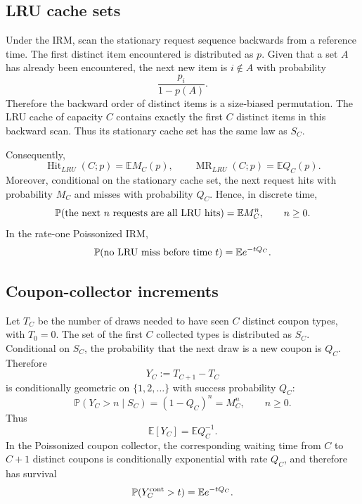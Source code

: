 \documentclass[11pt]{article}
\newcommand{\E}{\mathbb E}
\newcommand{\Pbb}{\mathbb P}
\newcommand{\1}{\mathbf 1}
\newcommand{\MR}{\operatorname{MR}}
\newcommand{\Hit}{\operatorname{Hit}}
\begin{document}
\subsection{LRU cache sets}

Under the IRM, scan the stationary request sequence backwards from a reference time.  The
first distinct item encountered is distributed as $p$.  Given that a set $A$ has already
been encountered, the next new item is $i\notin A$ with probability
\[
        \frac{p_i}{1-p(A)}.
\]
Therefore the backward order of distinct items is a size-biased permutation.  The LRU
cache of capacity $C$ contains exactly the first $C$ distinct items in this backward scan.
Thus its stationary cache set has the same law as $S_C$.

Consequently,
\begin{equation}\label{eq:lru-hit-miss}
        \Hit_{LRU}(C;p)=\E M_C(p),
        \qquad
        \MR_{LRU}(C;p)=\E Q_C(p).
\end{equation}
Moreover, conditional on the stationary cache set, the next request hits with probability
$M_C$ and misses with probability $Q_C$.  Hence, in discrete time,
\begin{equation}\label{eq:no-miss-discrete}
        \Pbb(\hbox{the next } n \hbox{ requests are all LRU hits})
        =\E M_C^n,
        \qquad n\ge0.
\end{equation}
In the rate-one Poissonized IRM,
\begin{equation}\label{eq:no-miss-continuous}
        \Pbb(\hbox{no LRU miss before time }t)=\E e^{-tQ_C}.
\end{equation}

\subsection{Coupon-collector increments}

Let $T_C$ be the number of draws needed to have seen $C$ distinct coupon types, with
$T_0=0$.  The set of the first $C$ collected types is distributed as $S_C$.  Conditional on
$S_C$, the probability that the next draw is a new coupon is $Q_C$.  Therefore
\[
        Y_C:=T_{C+1}-T_C
\]
is conditionally geometric on $\{1,2,\ldots\}$ with success probability $Q_C$:
\begin{equation}\label{eq:geom-survival}
        \Pbb(Y_C>n\mid S_C)=(1-Q_C)^n=M_C^n,
        \qquad n\ge0.
\end{equation}
Thus
\begin{equation}\label{eq:increment-mean}
        \E[Y_C]=\E Q_C^{-1}.
\end{equation}
In the Poissonized coupon collector, the corresponding waiting time from $C$ to $C+1$
distinct coupons is conditionally exponential with rate $Q_C$, and therefore has survival
\begin{equation}\label{eq:poissonized-increment-survival}
        \Pbb(Y_C^{\rm cont}>t)=\E e^{-tQ_C}.
\end{equation}
\end{document}
